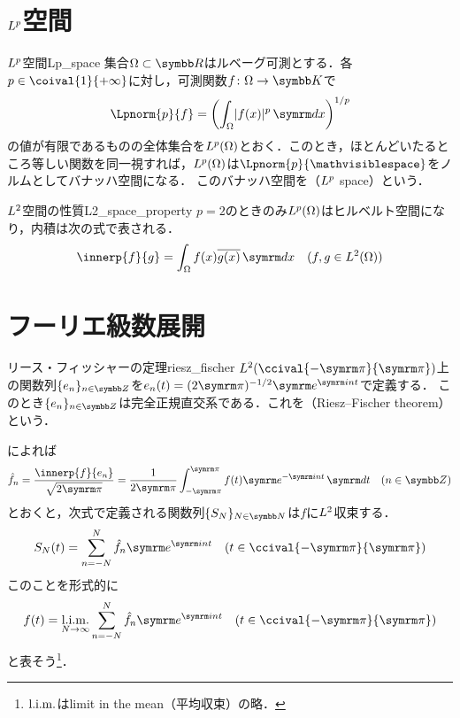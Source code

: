 \documentclass[../../main]{subfiles}
\begin{document}
\section{\texorpdfstring{\(\Lebesgue{p}\)}{Lp}空間}
\label{section:lp_space}

\begin{definition}{\(\Lebesgue{p}\)空間}{Lp_space}
  集合\(\Omega\subset\numset{R}\)はルベーグ可測とする．各\(p\in\coival{1}{+\infty}\)に対し，可測関数\(f\colon\Omega\to\numset{K}\)で
  \[
    \Lpnorm{p}{f} = \pqty*{\int_\Omega\abs{f(x)}^p\intd{x}}^{1/p}
  \]
  の値が有限であるものの全体集合を\(\Lebesgue{p}(\Omega)\)とおく．このとき，ほとんどいたるところ等しい関数を同一視すれば，\(\Lebesgue{p}(\Omega)\)は\(\Lpnorm{p}{\holder}\)をノルムとしてバナッハ空間になる．
  このバナッハ空間を（\(\Lebesgue{p}\) space）という．
\end{definition}

\begin{proposition}{\(\Lebesgue{2}\)空間の性質}{L2_space_property}
  \(p=2\)のときのみ\(\Lebesgue{p}(\Omega)\)はヒルベルト空間になり，内積は次の式で表される．
  \[
    \innerp{f}{g} = \int_\Omega f(x)\conj*{g(x)}\intd{x}\quad(f,g\in\Lebesgue{2}(\Omega))
  \]
\end{proposition}

\section{フーリエ級数展開}

\begin{theorem}{リース・フィッシャーの定理}{riesz_fischer}
  \(\Lebesgue{2}(\ccival{-\krez}{\krez})\)上の関数列\(\seq{e_n}_{n\in\numset{Z}}\)を\(e_n(t)=(2\krez)^{-1/2}\napr^{\iuni nt}\)で定義する．
  このとき\(\seq{e_n}_{n\in\numset{Z}}\)は完全正規直交系である．これを（Riesz–Fischer theorem）という．
\end{theorem}

によれば
\[
  \hat{f}_n = \frac{\innerp{f}{e_n}}{\sqrt{2\krez}}
  = \frac{1}{2\krez}\int_{-\krez}^{\krez}f(t)\napr^{-\iuni nt}\intd{t}\quad(n\in\numset{Z})
\]
とおくと，次式で定義される関数列\(\seq{S_N}_{N\in\numset{N}}\)は\(f\)に\(\Lebesgue{2}\)収束する．
\[
  S_N(t) = \sum_{n=-N}^N\hat{f}_n\napr^{\iuni nt}\quad(t\in\ccival{-\krez}{\krez})
\]
このことを形式的に
\[
  f(t) = \sqlim_{N\to\infty}\sum_{n=-N}^N\hat{f}_n\napr^{\iuni nt}\quad(t\in\ccival{-\krez}{\krez})
\]
と表そう\footnote{\(\operatorname*{l{.}i{.}m{.}}\)はlimit in the mean（平均収束）の略．}．
\end{document}
